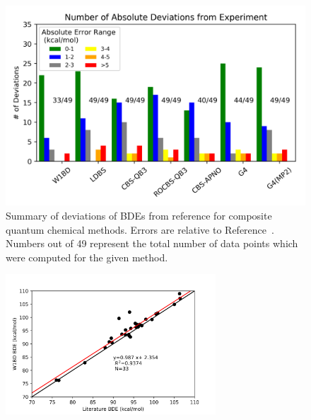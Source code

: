 \newpage
{}
\begin{figure}[htb]
  \centering
  \includegraphics[width=\textwidth]{figures/bde-mae-barchart}
  \caption[Summary of deviations of BDEs from reference for composite quantum chemical methods.]{Summary of deviations of BDEs from reference for composite quantum chemical methods. Errors are relative to Reference~\protect{}. Numbers out of 49 represent the total number of data points which were computed for the given method.}
\end{figure}

\begin{figure}
  \centering
  \includegraphics[width=0.7\textwidth]{figures/lit-w1bd}
\end{figure}

